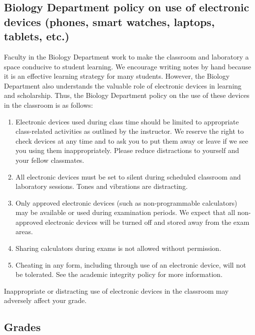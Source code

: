 \documentclass{tufte-handout}
\begin{document}
\begin{fullwidth}

\subsection{Biology Department policy on use of electronic devices (phones, smart watches, laptops, tablets, etc.)}

Faculty in the Biology Department work to make the classroom and laboratory a space conducive to student learning. We encourage writing notes by hand because it is an effective learning strategy for many students. However, the Biology Department also understands the valuable role of electronic devices in learning and scholarship. Thus, the Biology Department policy on the use of these devices in the classroom is as follows:


\begin{enumerate}
\item Electronic devices used during class time should be limited to appropriate class-related activities as outlined by the instructor. We reserve the right to check devices at any time and to ask you to put them away or leave if we see you using them inappropriately. Please reduce distractions to yourself and your fellow classmates.
\item All electronic devices must be set to silent during scheduled classroom and laboratory sessions. Tones and vibrations are distracting.
\item Only approved electronic devices (such as non-programmable calculators) may be available or used during examination periods. We expect that all non-approved electronic devices will be turned off and stored away from the exam areas.
\item Sharing calculators during exams is not allowed without permission. 
\item Cheating in any form, including through use of an electronic device, will not be tolerated. See the academic integrity policy for more information.
\end{enumerate}

Inappropriate or distracting use of electronic devices in the classroom may adversely affect your  grade. 

\end{fullwidth}

\subsection{Grades}
\end{document}
